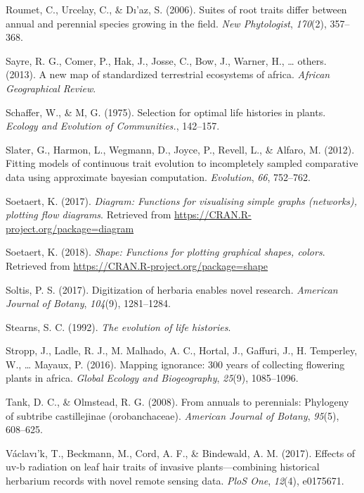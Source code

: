\documentclass[man,floatsintext]{apa6}
\theoremstyle{definition}
\theoremstyle{definition}
\theoremstyle{definition}
\theoremstyle{remark}
\begin{document}
\leavevmode\hypertarget{ref-roumet2006suites}{}%
Roumet, C., Urcelay, C., \& Dı'az, S. (2006). Suites of root traits
differ between annual and perennial species growing in the field.
\emph{New Phytologist}, \emph{170}(2), 357--368.

\leavevmode\hypertarget{ref-sayre2013new}{}%
Sayre, R. G., Comer, P., Hak, J., Josse, C., Bow, J., Warner, H.,
\ldots{} others. (2013). A new map of standardized terrestrial
ecosystems of africa. \emph{African Geographical Review}.

\leavevmode\hypertarget{ref-schaffer1975selection}{}%
Schaffer, W., \& M, G. (1975). Selection for optimal life histories in
plants. \emph{Ecology and Evolution of Communities.}, 142--157.

\leavevmode\hypertarget{ref-R-geiger_c}{}%
Slater, G., Harmon, L., Wegmann, D., Joyce, P., Revell, L., \& Alfaro,
M. (2012). Fitting models of continuous trait evolution to incompletely
sampled comparative data using approximate bayesian computation.
\emph{Evolution}, \emph{66}, 752--762.

\leavevmode\hypertarget{ref-R-diagram}{}%
Soetaert, K. (2017). \emph{Diagram: Functions for visualising simple
graphs (networks), plotting flow diagrams}. Retrieved from
\url{https://CRAN.R-project.org/package=diagram}

\leavevmode\hypertarget{ref-R-shape}{}%
Soetaert, K. (2018). \emph{Shape: Functions for plotting graphical
shapes, colors}. Retrieved from
\url{https://CRAN.R-project.org/package=shape}

\leavevmode\hypertarget{ref-soltis2017digitization}{}%
Soltis, P. S. (2017). Digitization of herbaria enables novel research.
\emph{American Journal of Botany}, \emph{104}(9), 1281--1284.

\leavevmode\hypertarget{ref-stearns1992evolution}{}%
Stearns, S. C. (1992). \emph{The evolution of life histories}.

\leavevmode\hypertarget{ref-stropp2016mapping}{}%
Stropp, J., Ladle, R. J., M. Malhado, A. C., Hortal, J., Gaffuri, J., H.
Temperley, W., \ldots{} Mayaux, P. (2016). Mapping ignorance: 300 years
of collecting flowering plants in africa. \emph{Global Ecology and
Biogeography}, \emph{25}(9), 1085--1096.

\leavevmode\hypertarget{ref-tank2008annuals}{}%
Tank, D. C., \& Olmstead, R. G. (2008). From annuals to perennials:
Phylogeny of subtribe castillejinae (orobanchaceae). \emph{American
Journal of Botany}, \emph{95}(5), 608--625.

\leavevmode\hypertarget{ref-vaclavik2017effects}{}%
Václavı'k, T., Beckmann, M., Cord, A. F., \& Bindewald, A. M. (2017).
Effects of uv-b radiation on leaf hair traits of invasive
plants---combining historical herbarium records with novel remote
sensing data. \emph{PloS One}, \emph{12}(4), e0175671.
\end{document}
